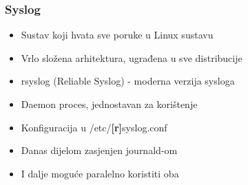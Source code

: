 \documentclass[t,table,usenames,dvipsnames]{beamer}
\begin{document}
\begin{frame}
    \frametitle{Syslog}
    \begin{itemize}
        \item Sustav koji hvata sve poruke u Linux sustavu
        \item Vrlo složena arhitektura, ugrađena u sve distribucije
        \item rsyslog (Reliable Syslog) - moderna verzija sysloga
        \item Daemon proces, jednostavan za korištenje
        \item Konfiguracija u /etc/\textbf{[r]}syslog.conf
    \end{itemize}
    \begin{itemize}
        \item Danas dijelom zasjenjen journald-om
        \item I dalje moguće paralelno koristiti oba
    \end{itemize}
\end{frame}
\end{document}
